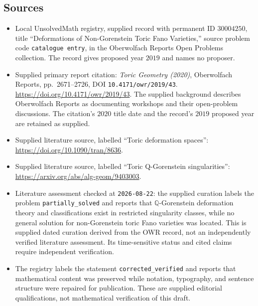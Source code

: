 \documentclass[11pt]{article}
\begin{document}
\subsection{Sources}
\begin{itemize}
\item Local UnsolvedMath registry, supplied record with permanent ID \(30004250\), title ``Deformations of Non-Gorenstein Toric Fano Varieties,'' source problem code \texttt{catalogue entry}, in the Oberwolfach Reports Open Problems collection. The record gives proposed year \(2019\) and names no proposer.
\item Supplied primary report citation: \emph{Toric Geometry (2020)}, Oberwolfach Reports, pp.\ 2671--2726, DOI \texttt{10.4171/owr/2019/43}. \url{https://doi.org/10.4171/owr/2019/43}. The supplied background describes Oberwolfach Reports as documenting workshops and their open-problem discussions. The citation's \(2020\) title date and the record's \(2019\) proposed year are retained as supplied.
\item Supplied literature source, labelled ``Toric deformation spaces'': \url{https://doi.org/10.1090/tran/8636}.
\item Supplied literature source, labelled ``Toric Q-Gorenstein singularities'': \url{https://arxiv.org/abs/alg-geom/9403003}.
\item Literature assessment checked at \texttt{2026-08-22}: the supplied curation labels the problem \texttt{partially\_solved} and reports that \(\mathbb Q\)-Gorenstein deformation theory and classifications exist in restricted singularity classes, while no general solution for non-Gorenstein toric Fano varieties was located. This is supplied dated curation derived from the OWR record, not an independently verified literature assessment. Its time-sensitive status and cited claims require independent verification.
\item The registry labels the statement \texttt{corrected\_verified} and reports that mathematical content was preserved while notation, typography, and sentence structure were repaired for publication. These are supplied editorial qualifications, not mathematical verification of this draft.
\end{itemize}
\end{document}
